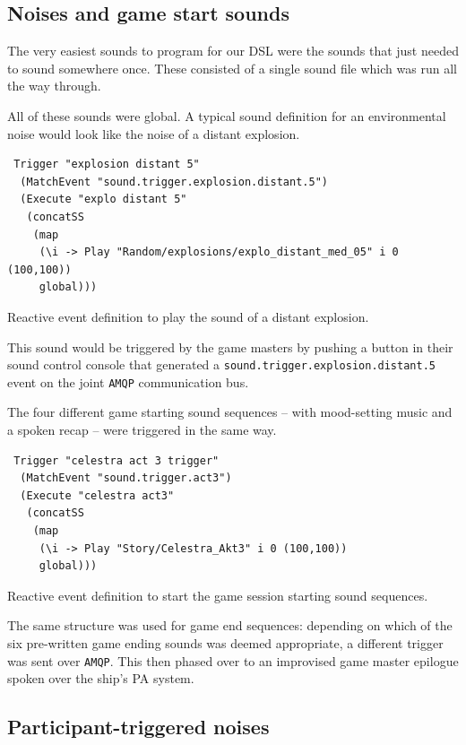 \subsection{Noises and game start sounds}
\label{sec:noises}

The very easiest sounds to program for our DSL were the sounds that just needed to sound somewhere once. These consisted of a single sound file which was run all the way through.

All of these sounds were global. A typical sound definition for an
environmental noise would look like the noise of a distant explosion.

\begin{listing}
\begin{verbatim}
 Trigger "explosion distant 5" 
  (MatchEvent "sound.trigger.explosion.distant.5") 
  (Execute "explo distant 5" 
   (concatSS 
    (map 
     (\i -> Play "Random/explosions/explo_distant_med_05" i 0 (100,100))
     global)))
\end{verbatim}
\caption{Reactive event definition to play the sound of a distant explosion.}
\end{listing}
This sound would be triggered by the game masters by pushing a button in their sound control console that generated a \texttt{sound.trigger.explosion.distant.5} event on the joint \texttt{AMQP} communication bus.

The four different game starting sound sequences -- with mood-setting music and a spoken recap -- were triggered in the same way.

\begin{listing}
\begin{verbatim}
 Trigger "celestra act 3 trigger" 
  (MatchEvent "sound.trigger.act3") 
  (Execute "celestra act3" 
   (concatSS 
    (map 
     (\i -> Play "Story/Celestra_Akt3" i 0 (100,100)) 
     global)))
\end{verbatim}
\caption{Reactive event definition to start the game session starting
  sound sequences.}
\end{listing}

The same structure was used for game end sequences: depending on which of the six pre-written game ending sounds was deemed appropriate, a different trigger was sent over \texttt{AMQP}. This then phased over to an improvised game master epilogue spoken over the ship's PA system.

\subsection{Participant-triggered noises}
\label{sec:part-trigg-nois}

